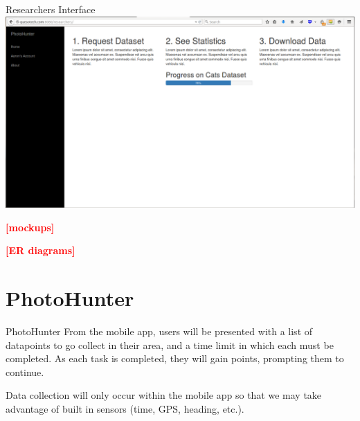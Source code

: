 \documentclass[aspectratio=169]{beamer}
\newcommand{\todo}[1]{\textcolor{red}{\textbf{[#1]}}}
\begin{document}
\begin{frame}{Researchers Interface}
  \includegraphics[width=\columnwidth]{researchers}
\end{frame}

\begin{frame}
  \todo{mockups}
\end{frame}

\begin{frame}
  \todo{ER diagrams}
\end{frame}

\section{PhotoHunter}

\begin{frame}{PhotoHunter}
  From the mobile app, users will be presented with a list of
  datapoints
  to go collect in their area, and a time limit in which each must be
  completed. As each task is completed, they will gain points,
  prompting
  them to continue.

  Data collection will only occur within the mobile app so that we may
  take advantage of built in sensors (time, GPS, heading, etc.).
\end{frame}
\end{document}
